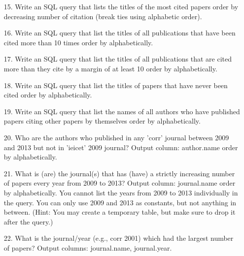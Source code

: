 \documentclass[10pt]{article}
\begin{document}
\begin{enumerate}
\item
[15.] Write an SQL query that lists the titles of the most cited papers order by decreasing number of citation (break ties using alphabetic order).
\item
[16.] Write an SQL query that  list the titles of all publications that have been cited more than 10 times order by alphabetically.  
\item
[17.] Write an SQL query that list the titles of all publications that are cited more than they cite by a margin of at least 10 order by alphabetically. 
\item
[18.] Write an SQL query that list the titles of papers that have never been cited order by alphabetically.
\item
[19.] Write an SQL query that list the names of all authors who have published papers citing other papers by themselves order by alphabetically. 
\item
[20.] Who are the authors who published in any 'corr' journal between 2009 and 2013 but not in 'ieicet' 2009 journal? Output column: author.name order by alphabetically.
\item 
[21.] What is (are) the journal(s) that has (have) a strictly increasing number of papers every year from 2009 to 2013? Output column: journal.name order by alphabetically. You cannot list the years from 2009 to 2013 individually in the query. You can only use 2009 and 2013 as constants, but not anything in between. (Hint: You may create a temporary table, but make sure to drop it after the query.)
\item 
[22.] What is the journal/year (e.g., corr 2001) which had the largest number of papers? Output columns: journal.name, journal.year.

\end{enumerate}
\end{document}
